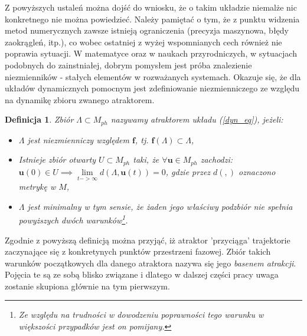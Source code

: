 \documentclass[12pt, twoside]{book}
\newtheorem{defi}{Definicja}
\begin{document}
Z powyższych ustaleń można dojść do wniosku, że o takim układzie niemalże nic konkretnego nie można powiedzieć. Należy pamiętać o tym, że z punktu widzenia metod numerycznych zawsze istnieją ograniczenia (precyzja maszynowa, błędy zaokrągleń, itp.), co wobec ostatniej z wyżej wspomnianych cech również nie poprawia sytuacji. W matematyce oraz w naukach przyrodniczych, w sytuacjach podobnych do zainstniałej, dobrym pomysłem jest próba znalezienie niezmienników - stałych elementów w rozważanych systemach. Okazuje się, że dla układów dynamicznych pomocnym jest zdefiniowanie niezmienniczego ze względu na dynamikę zbioru zwanego atraktorem.
\begin{defi}
	Zbiór $\Lambda \subset M_{ph}$ nazywamy atraktorem układu (\ref{dyn_eq}), jeżeli:
	\begin{itemize}
		\item $\Lambda $ jest niezmienniczy względem $ \textbf{f} $, tj. $ \textbf{f}(\Lambda) \subset \Lambda $,
		\item Istnieje zbiór otwarty $ U \subset M_{ph} $ taki, że
		$\forall \textbf{u} \in M_{ph}$ zachodzi: \newline
		$ \textbf{u}(0) \in U  \implies \lim\limits_{t->\infty} d(\Lambda, \textbf{u}(t))=0$, \newline gdzie przez $ d(,) $ oznaczono metrykę w $ M $,
		\item $\Lambda$ jest minimalny w tym sensie, że żaden jego właściwy podzbiór nie spełnia powyższych dwóch warunków\footnote{Ze względu na trudności w dowodzeniu poprawności tego warunku w większości przypadków jest on pomijany.}.
	\end{itemize}  
\end{defi}
Zgodnie z powyższą definicją można przyjąć, iż atraktor 'przyciąga' trajektorie zaczynające się z konkretynych punktów przestrzeni fazowej. Zbiór takich warunków początkowych dla danego atraktora nazywa się jego \textit{basenem atrakcji}. Pojęcia te są ze sobą blisko związane i dlatego w dalszej części pracy uwaga zostanie skupiona głównie na tym pierwszym. \newline
\end{document}
